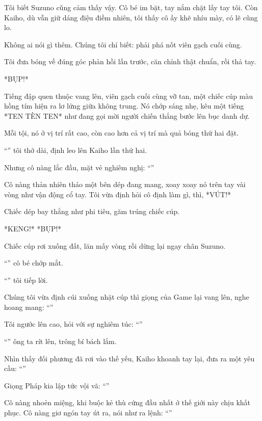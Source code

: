 \documentclass[../main.tex]{subfiles}
\begin{document}
Tôi biết Suzuno cũng cảm thấy vậy. Cô bé im bặt, tay nắm chặt lấy tay tôi. Còn Kaiho, dù vẫn giữ dáng điệu điềm nhiên, tôi thấy cô ấy khẽ nhíu mày, có lẽ cũng lo.

Không ai nói gì thêm. Chúng tôi chỉ biết: phải phá nốt viên gạch cuối cùng.

Tôi đưa bóng về đúng góc phản hồi lần trước, căn chỉnh thật chuẩn, rồi thả tay.

*BỤP!*

Tiếng đập quen thuộc vang lên, viên gạch cuối cùng vỡ tan, một chiếc cúp màu hồng tím hiện ra lơ lửng giữa không trung. Nó chớp sáng nhẹ, kêu một tiếng *TEN TÈN TEN* như đang gọi mời người chiến thắng bước lên bục danh dự.


Mỗi tội, nó ở vị trí rất cao, còn cao hơn cả vị trí mà quả bóng thứ hai đặt.

``'' tôi thở dài, định leo lên Kaiho lần thứ hai.

Nhưng cô nàng lắc đầu, mặt vẻ nghiêm nghị: ``''

Cô nàng thản nhiên tháo một bên dép đang mang, xoay xoay nó trên tay vài vòng như vận động cổ tay. Tôi vừa định hỏi cô định làm gì, thì, *VÚT!*

Chiếc dép bay thẳng như phi tiêu, găm trúng chiếc cúp.

*KENG!* *BỤP!*

Chiếc cúp rơi xuống đất, lăn mấy vòng rồi dừng lại ngay chân Suzuno.

``'' cô bé chớp mắt.

``'' tôi tiếp lời.

Chúng tôi vừa định cúi xuống nhặt cúp thì giọng của Game lại vang lên, nghe hoang mang: ``''

Tôi ngước lên cao, hỏi với sự nghiêm túc: ``''

``'' ông ta rít lên, trông bí bách lắm.

Nhìn thấy đối phương đã rơi vào thế yếu, Kaiho khoanh tay lại, đưa ra một yêu cầu: ``''

Giọng Pháp kia lập tức vội vã: ``''

Cô nàng nhoẻn miệng, khi buộc kẻ thù cứng đầu nhất ở thế giới này chịu khất phục. Cô nàng giơ ngón tay út ra, nói như ra lệnh: ``''
\end{document}
